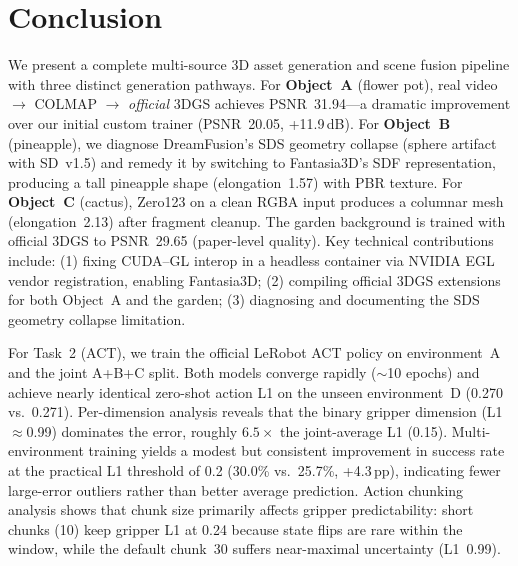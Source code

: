 \documentclass[10pt,twocolumn,letterpaper]{article}
\begin{document}
\section{Conclusion}

We present a complete multi-source 3D asset generation and scene fusion pipeline with three distinct generation pathways. For \textbf{Object~A} (flower pot), real video $\to$ COLMAP $\to$ \emph{official} 3DGS achieves PSNR~31.94---a dramatic improvement over our initial custom trainer (PSNR~20.05, +11.9\,dB). For \textbf{Object~B} (pineapple), we diagnose DreamFusion's SDS geometry collapse (sphere artifact with SD~v1.5) and remedy it by switching to Fantasia3D's SDF representation, producing a tall pineapple shape (elongation~1.57) with PBR texture. For \textbf{Object~C} (cactus), Zero123 on a clean RGBA input produces a columnar mesh (elongation~2.13) after fragment cleanup. The garden background is trained with official 3DGS to PSNR~29.65 (paper-level quality). Key technical contributions include: (1) fixing CUDA--GL interop in a headless container via NVIDIA EGL vendor registration, enabling Fantasia3D; (2) compiling official 3DGS extensions for both Object~A and the garden; (3) diagnosing and documenting the SDS geometry collapse limitation.

For Task~2 (ACT), we train the official LeRobot ACT policy on environment~A and the joint A+B+C split. Both models converge rapidly ($\sim$10 epochs) and achieve nearly identical zero-shot action L1 on the unseen environment~D (0.270 vs.\ 0.271). Per-dimension analysis reveals that the binary gripper dimension (L1~$\approx$0.99) dominates the error, roughly $6.5\times$ the joint-average L1 (0.15). Multi-environment training yields a modest but consistent improvement in success rate at the practical L1 threshold of 0.2 (30.0\% vs.\ 25.7\%, +4.3\,pp), indicating fewer large-error outliers rather than better average prediction. Action chunking analysis shows that chunk size primarily affects gripper predictability: short chunks (10) keep gripper L1 at 0.24 because state flips are rare within the window, while the default chunk~30 suffers near-maximal uncertainty (L1~0.99).
\end{document}

